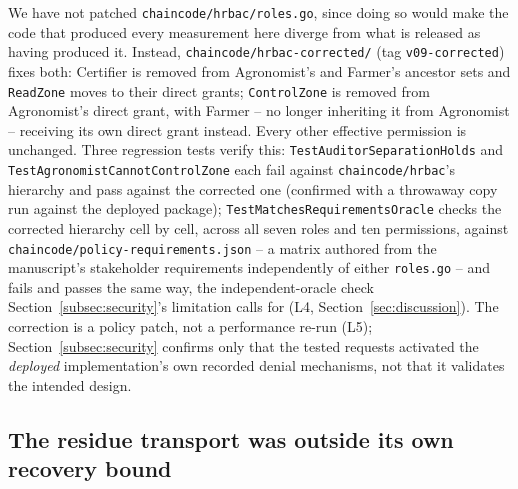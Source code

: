 \documentclass[a4paper,fleqn]{cas-sc}
\begin{document}
We have not patched \texttt{chaincode/hrbac/roles.go}, since doing so
would make the code that produced every measurement here diverge from
what is released as having produced it. Instead,
\texttt{chaincode/hrbac-corrected/} (tag \texttt{v09-corrected}) fixes
both: Certifier is removed from Agronomist's and Farmer's ancestor sets
and \texttt{ReadZone} moves to their direct grants; \texttt{ControlZone}
is removed from Agronomist's direct grant, with Farmer -- no longer
inheriting it from Agronomist -- receiving its own direct grant instead.
Every other effective permission is unchanged. Three regression tests
verify this: \texttt{TestAuditorSeparationHolds} and
\texttt{TestAgronomistCannotControlZone} each fail against
\texttt{chaincode/hrbac}'s hierarchy and pass against the corrected one
(confirmed with a throwaway copy run against the deployed package);
\texttt{TestMatchesRequirementsOracle} checks the corrected hierarchy
cell by cell, across all seven roles and ten permissions, against
\texttt{chaincode/policy-requirements.json} -- a matrix authored from the
manuscript's stakeholder requirements independently of either
\texttt{roles.go} -- and fails and passes the same way, the
independent-oracle check Section~\ref{subsec:security}'s limitation calls
for (L4, Section~\ref{sec:discussion}). The correction is a policy patch,
not a performance re-run (L5); Section~\ref{subsec:security} confirms only
that the tested requests activated the \emph{deployed} implementation's
own recorded denial mechanisms, not that it validates the intended
design.

\subsection{The residue transport was outside its own recovery bound}
\label{subsec:pm_crt}
\end{document}
